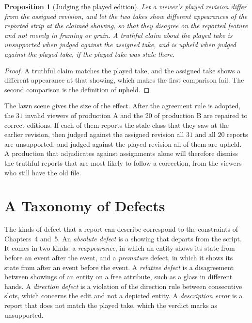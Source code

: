 \documentclass[11pt,twoside,openright]{book}
\theoremstyle{plain}
\newtheorem{proposition}[theorem]{Proposition}
\theoremstyle{definition}
\theoremstyle{remark}
\begin{document}
\begin{proposition}[Judging the played edition]\label{prop:played}
Let a viewer's played revision differ from the assigned revision, and let the two takes show different appearances of the reported strip at the claimed showing, so that they disagree on the reported feature and not merely in framing or grain. A truthful claim about the played take is unsupported when judged against the assigned take, and is upheld when judged against the played take, if the played take was stale there.
\end{proposition}

\begin{proof}
A truthful claim matches the played take, and the assigned take shows a different appearance at that showing, which makes the first comparison fail. The second comparison is the definition of upheld.
\end{proof}

The lawn scene gives the size of the effect. After the agreement rule is adopted, the $31$ invalid viewers of production A and the $20$ of production B are repaired to correct editions. If each of them reports the stale class that they saw at the earlier revision, then judged against the assigned revision all $31$ and all $20$ reports are unsupported, and judged against the played revision all of them are upheld. A production that adjudicates against assignments alone will therefore dismiss the truthful reports that are most likely to follow a correction, from the viewers who still have the old file.

\section{A Taxonomy of Defects}\label{sec:taxonomy}

The kinds of defect that a report can describe correspond to the constraints of Chapters~4 and~5. An \emph{absolute defect} is a showing that departs from the script. It comes in two kinds: a \emph{reappearance}, in which an entity shows its state from before an event after the event, and a \emph{premature} defect, in which it shows its state from after an event before the event. A \emph{relative defect} is a disagreement between showings of an entity on a free attribute, such as a glass in different hands. A \emph{direction defect} is a violation of the direction rule between consecutive slots, which concerns the edit and not a depicted entity. A \emph{description error} is a report that does not match the played take, which the verdict marks as unsupported.
\end{document}
